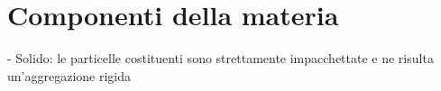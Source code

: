 \section{Componenti della materia}
- Solido: le particelle costituenti sono strettamente impacchettate e ne risulta un'aggregazione rigida
